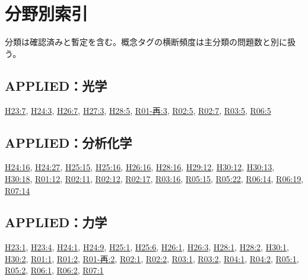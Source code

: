 \chapter{分野別索引}
分類は確認済みと暫定を含む。概念タグの横断頻度は主分類の問題数と別に扱う。
\section{APPLIED：光学}
\hyperref[q:h23-reg-applied-07]{H23:7}, \hyperref[q:h24-reg-applied-03]{H24:3}, \hyperref[q:h26-reg-applied-07]{H26:7}, \hyperref[q:h27-reg-applied-03]{H27:3}, \hyperref[q:h28-reg-applied-05]{H28:5}, \hyperref[q:r01-ret-applied-03]{R01-再:3}, \hyperref[q:r02-reg-applied-05]{R02:5}, \hyperref[q:r02-reg-applied-07]{R02:7}, \hyperref[q:r03-reg-applied-05]{R03:5}, \hyperref[q:r06-reg-applied-05]{R06:5}
\section{APPLIED：分析化学}
\hyperref[q:h24-reg-applied-16]{H24:16}, \hyperref[q:h24-reg-applied-27]{H24:27}, \hyperref[q:h25-reg-applied-15]{H25:15}, \hyperref[q:h25-reg-applied-16]{H25:16}, \hyperref[q:h26-reg-applied-16]{H26:16}, \hyperref[q:h28-reg-applied-16]{H28:16}, \hyperref[q:h29-reg-applied-12]{H29:12}, \hyperref[q:h30-reg-applied-12]{H30:12}, \hyperref[q:h30-reg-applied-13]{H30:13}, \hyperref[q:h30-reg-applied-18]{H30:18}, \hyperref[q:r01-reg-applied-12]{R01:12}, \hyperref[q:r02-reg-applied-11]{R02:11}, \hyperref[q:r02-reg-applied-12]{R02:12}, \hyperref[q:r02-reg-applied-17]{R02:17}, \hyperref[q:r03-reg-applied-16]{R03:16}, \hyperref[q:r05-reg-applied-15]{R05:15}, \hyperref[q:r05-reg-applied-22]{R05:22}, \hyperref[q:r06-reg-applied-14]{R06:14}, \hyperref[q:r06-reg-applied-19]{R06:19}, \hyperref[q:r07-reg-applied-14]{R07:14}
\section{APPLIED：力学}
\hyperref[q:h23-reg-applied-01]{H23:1}, \hyperref[q:h23-reg-applied-04]{H23:4}, \hyperref[q:h24-reg-applied-01]{H24:1}, \hyperref[q:h24-reg-applied-09]{H24:9}, \hyperref[q:h25-reg-applied-01]{H25:1}, \hyperref[q:h25-reg-applied-06]{H25:6}, \hyperref[q:h26-reg-applied-01]{H26:1}, \hyperref[q:h26-reg-applied-03]{H26:3}, \hyperref[q:h28-reg-applied-01]{H28:1}, \hyperref[q:h28-reg-applied-02]{H28:2}, \hyperref[q:h30-reg-applied-01]{H30:1}, \hyperref[q:h30-reg-applied-02]{H30:2}, \hyperref[q:r01-reg-applied-01]{R01:1}, \hyperref[q:r01-reg-applied-02]{R01:2}, \hyperref[q:r01-ret-applied-02]{R01-再:2}, \hyperref[q:r02-reg-applied-01]{R02:1}, \hyperref[q:r02-reg-applied-02]{R02:2}, \hyperref[q:r03-reg-applied-01]{R03:1}, \hyperref[q:r03-reg-applied-02]{R03:2}, \hyperref[q:r04-reg-applied-01]{R04:1}, \hyperref[q:r04-reg-applied-02]{R04:2}, \hyperref[q:r05-reg-applied-01]{R05:1}, \hyperref[q:r05-reg-applied-02]{R05:2}, \hyperref[q:r06-reg-applied-01]{R06:1}, \hyperref[q:r06-reg-applied-02]{R06:2}, \hyperref[q:r07-reg-applied-01]{R07:1}
